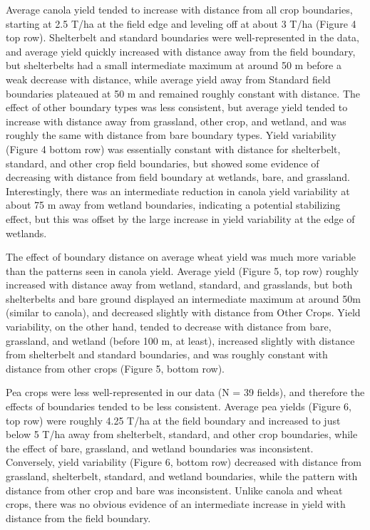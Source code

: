 \documentclass[]{elsarticle} %
\begin{document}
Average canola yield tended to increase with distance from all crop boundaries, starting at 2.5 T/ha at the field edge and leveling off at about 3 T/ha (Figure 4 top row).
Shelterbelt and standard boundaries were well-represented in the data, and average yield quickly increased with distance away from the field boundary, but shelterbelts had a small intermediate maximum at around 50 m before a weak decrease with distance, while average yield away from Standard field boundaries plateaued at 50 m and remained roughly constant with distance.
The effect of other boundary types was less consistent, but average yield tended to increase with distance away from grassland, other crop, and wetland, and was roughly the same with distance from bare boundary types.
Yield variability (Figure 4 bottom row) was essentially constant with distance for shelterbelt, standard, and other crop field boundaries, but showed some evidence of decreasing with distance from field boundary at wetlands, bare, and grassland.
Interestingly, there was an intermediate reduction in canola yield variability at about 75 m away from wetland boundaries, indicating a potential stabilizing effect, but this was offset by the large increase in yield variability at the edge of wetlands.

The effect of boundary distance on average wheat yield was much more variable than the patterns seen in canola yield.
Average yield (Figure 5, top row) roughly increased with distance away from wetland, standard, and grasslands, but both shelterbelts and bare ground displayed an intermediate maximum at around 50m (similar to canola), and decreased slightly with distance from Other Crops.
Yield variability, on the other hand, tended to decrease with distance from bare, grassland, and wetland (before 100 m, at least), increased slightly with distance from shelterbelt and standard boundaries, and was roughly constant with distance from other crops (Figure 5, bottom row).

Pea crops were less well-represented in our data (N = 39 fields), and therefore the effects of boundaries tended to be less consistent.
Average pea yields (Figure 6, top row) were roughly 4.25 T/ha at the field boundary and increased to just below 5 T/ha away from shelterbelt, standard, and other crop boundaries, while the effect of bare, grassland, and wetland boundaries was inconsistent.
Conversely, yield variability (Figure 6, bottom row) decreased with distance from grassland, shelterbelt, standard, and wetland boundaries, while the pattern with distance from other crop and bare was inconsistent.
Unlike canola and wheat crops, there was no obvious evidence of an intermediate increase in yield with distance from the field boundary.
\end{document}

